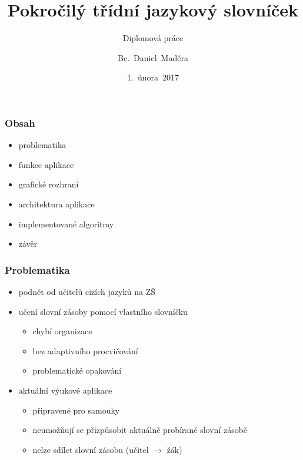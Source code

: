 




\usepackage{palatino}
\usepackage{graphicx}
\usepackage{transparent}


\title[Pokročilý třídní jazykový slovníček]{Pokročilý třídní jazykový slovníček}
\subtitle{Diplomová práce}
\author[Bc.~Daniel~Maděra]{Bc.~Daniel~Maděra}
\date{1.~února~2017}
\newcommand{\TextTitulniStranaPodLinkou}{\tiny
Studentská 2 {\color{FM_TUL} |} 461\,17 Liberec 2 {\color{FM_TUL} |} {daniel.madera@tul.cz} {\color{FM_TUL} |} 
\href{http://www.fm.tul.cz/}{www.fm.tul.cz}}

\renewcommand{\inserttotalframenumber}{\pageref{lastslide}}




\begin{frame}
    \titlepage
\end{frame}

\begin{frame}
    \frametitle{Obsah}
    \begin{itemize}
        \item problematika
        \item funkce aplikace
        \item grafické rozhraní
        \item architektura aplikace
        \item implementované algoritmy
        \item závěr
    \end{itemize}
\end{frame}


\begin{frame}[t]
    \frametitle{Problematika}
    \begin{itemize}[<+->]
        \item podnět od učitelů cizích jazyků na ZŠ
        \item učení slovní zásoby pomocí vlastního slovníčku
        \begin{itemize}
            \item chybí organizace
            \item bez adaptivního procvičování
            \item problematické opakování
        \end{itemize}
        \item aktuální výukové aplikace
        \begin{itemize}
            \item připravené pro samouky
            \item neumožňují se přizpůsobit aktuálně probírané slovní zásobě
            \item nelze sdílet slovní zásobu (učitel $\rightarrow$ žák)
        \end{itemize}
    \end{itemize}
\end{frame}

